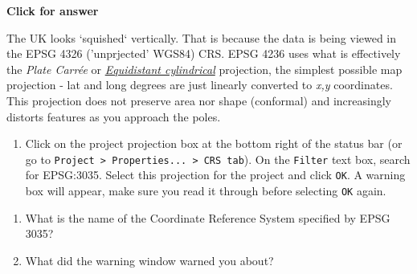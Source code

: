 \documentclass[
  letterpaper,
  DIV=11,
  numbers=noendperiod]{scrreprt}
\providecommand{\tightlist}{%
  \setlength{\itemsep}{0pt}\setlength{\parskip}{0pt}}\usepackage{longtable,booktabs,array}
\begin{document}
\begin{tcolorbox}[enhanced jigsaw, toprule=.15mm, breakable, left=2mm, colframe=quarto-callout-important-color-frame, colback=white, arc=.35mm, leftrule=.75mm, opacityback=0, rightrule=.15mm, bottomrule=.15mm]

\vspace{-3mm}\textbf{Click for answer}\vspace{3mm}

The UK looks `squished` vertically. That is because the data is being
viewed in the EPSG 4326 ('unprjected' WGS84) CRS. EPSG 4236 uses what is
effectively the \emph{Plate Carrée} or
\href{https://proj.org/en/9.4/operations/projections/eqc.html}{\emph{Equidistant
cylindrical}} projection, the simplest possible map projection - lat and
long degrees are just linearly converted to \emph{x,y} coordinates. This
projection does not preserve area nor shape (conformal) and increasingly
distorts features as you approach the poles.

\end{tcolorbox}

\begin{enumerate}
\def\labelenumi{(\arabic{enumi})}
\setcounter{enumi}{52}
\tightlist
\item
  Click on the project projection box at the bottom right of the status
  bar (or go to
  \texttt{Project\ \textgreater{}\ Properties...\ \textgreater{}\ CRS\ tab}).
  On the \texttt{Filter} text box, search for EPSG:3035. Select this
  projection for the project and click \texttt{OK}. A warning box will
  appear, make sure you read it through before selecting \texttt{OK}
  again.
\end{enumerate}

\begin{tcolorbox}[enhanced jigsaw, coltitle=black, toprule=.15mm, breakable, opacitybacktitle=0.6, left=2mm, colback=white, leftrule=.75mm, rightrule=.15mm, colbacktitle=quarto-callout-important-color!10!white, toptitle=1mm, titlerule=0mm, colframe=quarto-callout-important-color-frame, arc=.35mm, bottomtitle=1mm, opacityback=0, bottomrule=.15mm, title=\textcolor{quarto-callout-important-color}{\faExclamation}\hspace{0.5em}{Stop and Think}]

\begin{enumerate}
\def\labelenumi{\alph{enumi})}
\item
  What is the name of the Coordinate Reference System specified by EPSG
  3035?
\item
  What did the warning window warned you about?
\end{enumerate}

\end{tcolorbox}
\end{document}

